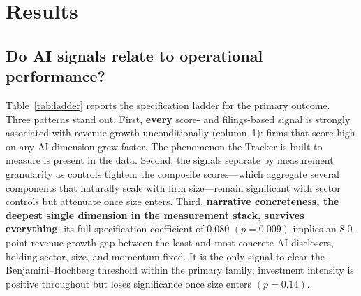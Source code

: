 \documentclass[11pt]{article}
\newcommand{\coef}[1]{\ensuremath{#1}}
\newcommand{\pval}[1]{\ensuremath{(p=#1)}}
\begin{document}
\section{Results}
\label{sec:results}

\subsection{Do AI signals relate to operational performance?}

Table~\ref{tab:ladder} reports the specification ladder for the primary
outcome. Three patterns stand out. First, \textbf{every} score- and filings-based
signal is strongly associated with revenue growth unconditionally (column~1):
firms that score high on any AI dimension grew faster. The phenomenon the Tracker is
built to measure is present in the data. Second, the signals separate by
measurement granularity as controls tighten: the composite scores---which
aggregate several components that naturally scale with firm size---remain
significant with sector controls but attenuate once size enters. Third,
\textbf{narrative concreteness, the deepest single dimension in the
measurement stack, survives everything}: its full-specification coefficient of
\coef{0.080} \pval{0.009} implies an 8.0-point revenue-growth gap between the
least and most concrete AI disclosers, holding sector, size, and momentum
fixed. It is the only signal to clear the Benjamini--Hochberg threshold within
the primary family; investment intensity is positive throughout but loses
significance once size enters \pval{0.14}.
\end{document}
